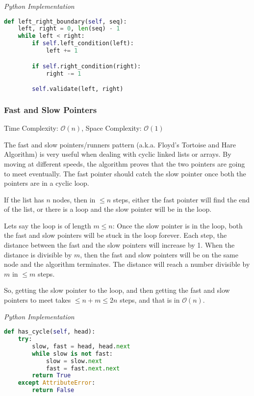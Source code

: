 \documentclass{article}
\newcommand{\bigO}{\ensuremath{\mathcal{O}}}
\begin{document}
\vspace{8pt} \emph{Python Implementation}
\begin{lstlisting}[language=Python]
def left_right_boundary(self, seq):
    left, right = 0, len(seq) - 1
    while left < right:
        if self.left_condition(left):
            left += 1

        if self.right_condition(right):
            right -= 1

        self.validate(left, right)
\end{lstlisting}
    
    \subsubsection{Fast and Slow Pointers}
    Time Complexity: $\bigO(n)$, Space Complexity: $\bigO(1)$
    
    The fast and slow pointers/runners pattern (a.k.a. Floyd’s Tortoise and Hare Algorithm) is very useful when dealing with cyclic linked lists or arrays. By moving at different speeds, the algorithm proves that the two pointers are going to meet eventually. The fast pointer should catch the slow pointer once both the pointers are in a cyclic loop.
     
    If the list has $n$ nodes, then in $\leq n$ steps, either the fast pointer will find the end of the list, or there is a loop and the slow pointer will be in the loop.
    
    Lets say the loop is of length $m \leq n$: Once the slow pointer is in the loop, both the fast and slow pointers will be stuck in the loop forever. Each step, the distance between the fast and the slow pointers will increase by 1. When the distance is divisible by $m$, then the fast and slow pointers will be on the same node and the algorithm terminates. The distance will reach a number divisible by $m$ in $\leq m$ steps.

    So, getting the slow pointer to the loop, and then getting the fast and slow pointers to meet takes $\leq n + m \leq 2n$ steps, and that is in $\bigO(n)$.

\vspace{8pt} \emph{Python Implementation}
\begin{lstlisting}[language=Python]
def has_cycle(self, head):
    try:
        slow, fast = head, head.next
        while slow is not fast:
            slow = slow.next
            fast = fast.next.next
        return True
    except AttributeError:
        return False
\end{lstlisting}
\end{document}
